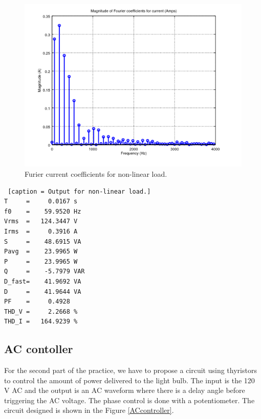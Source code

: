 \documentclass[journal]{IEEEtran}
\begin{document}
\begin{figure}[h]
\centering
\includegraphics[clip,width=\columnwidth]
{zoomed_current_furier_coefficients_computer.png}
\caption{Furier current coefficients for non-linear load.}
\label{fourier_corrent_coefficients_nonlinear}
\end{figure}

\begin{lstlisting} [caption = Output for non-linear load.]
T     =     0.0167 s 
f0    =    59.9520 Hz 
Vrms  =   124.3447 V
Irms  =     0.3916 A
S     =    48.6915 VA
Pavg  =    23.9965 W 
P     =    23.9965 W 
Q     =    -5.7979 VAR 
D_fast=    41.9692 VA 
D     =    41.9644 VA 
PF    =     0.4928 
THD_V =     2.2668 %
THD_I =   164.9239 %
\end{lstlisting}

\subsection{AC contoller}

For the second part of the practice, we have to propose a 
circuit using thyristors to control the amount of power 
delivered to the light bulb. The input is the 120 V AC and 
the output is an AC waveform where there is a delay angle 
before triggering the AC voltage. The phase control is 
done with a potentiometer. The circuit designed is shown 
in the Figure \ref{ACcontroller}.
\end{document}
